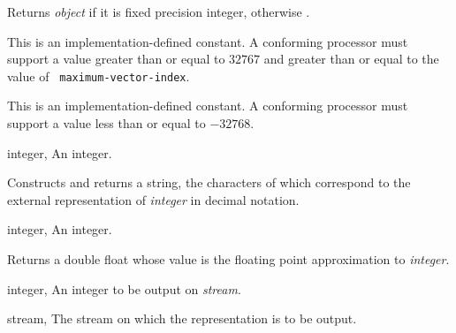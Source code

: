 \begin{optDefinition}
\result%
Returns {\em object\/} if it is fixed precision integer, otherwise
\nil{}.


\remarks%
This is an implementation-defined constant.  A conforming processor
must support a value greater than or equal to $32767$ and greater than
or equal to the value of {\tt
maximum-vector-index}.


\remarks%
This is an implementation-defined constant.  A conforming processor
must support a value less than or equal to
$-32768$.

%
\begin{specargs}
    \item[integer, \classref{fixed-precision-integer}] An integer.
\end{specargs}
%
\result%
Constructs and returns a string, the characters of which correspond to
the external representation of {\em integer\/} in decimal notation.

\begin{specargs}
\item[integer, \classref{fixed-precision-integer}] An integer.
\end{specargs}

\result%
Returns a double float whose value is the floating point approximation
to {\em integer}.

\begin{specargs}
\item[integer, \classref{fixed-precision-integer}] An integer to be output on {\em stream}.
\item[stream, \classref{stream}] The stream on which the representation is
to be output.
\end{specargs}


\end{optDefinition}
